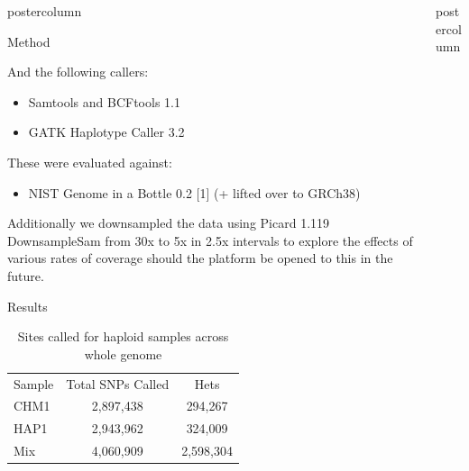 \documentclass[final]{beamer}
\begin{document}
\begin{frame}{}
\begin{columns}
\begin{column}{.49\textwidth}
\begin{beamercolorbox}[center,wd=\textwidth]{postercolumn}
\begin{minipage}[T]{.95\textwidth}
\begin{block}{Method}
\begin{itemize}
                \end{itemize}
              And the following callers:
                \begin{itemize} 
                    \item Samtools and BCFtools 1.1
                    \item GATK Haplotype Caller 3.2
                \end{itemize}
              These were evaluated against:
                \begin{itemize} 
                    \item NIST Genome in a Bottle 0.2 [1] (+ lifted over to GRCh38)
                \end{itemize}
                Additionally we downsampled the data using Picard 1.119 DownsampleSam from 30x to 5x in 2.5x intervals to explore the effects of various rates of coverage should the platform be opened to this in the future.
            \end{block}
            \begin{block}{Results}
            \begin{table}[h]
\begin{tabular}{|l|c|c|}
\hline
Sample  & Total SNPs Called & Hets \\ \cline{1-3} %
CHM1 & 2,897,438 & 294,267  \\ \cline{1-3} %
HAP1 & 2,943,962 & 324,009 \\ \cline{1-3} %
Mix & 4,060,909 & 2,598,304   \\ \cline{1-3} %
\hline
\end{tabular}
\caption{Sites called for haploid samples across whole genome}
\label{table:1}
\end{table}

            \end{block}
            \vfill

            \end{minipage}
        \end{beamercolorbox}
    \end{column}
        \begin{column}{.49\textwidth}
        \begin{beamercolorbox}[center,wd=\textwidth]{postercolumn}
            \begin{minipage}[T]{.95\textwidth}  %



\end{minipage}
\end{beamercolorbox}
\end{column}
\end{columns}
\end{frame}
\end{document}
